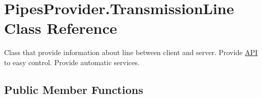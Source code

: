 \hypertarget{class_pipes_provider_1_1_transmission_line}{}\section{Pipes\+Provider.\+Transmission\+Line Class Reference}
\label{class_pipes_provider_1_1_transmission_line}


Class that provide information about line between client and server. Provide \mbox{\hyperlink{class_pipes_provider_1_1_a_p_i}{A\+PI}} to easy control. Provide automatic services.  


\subsection*{Public Member Functions}
